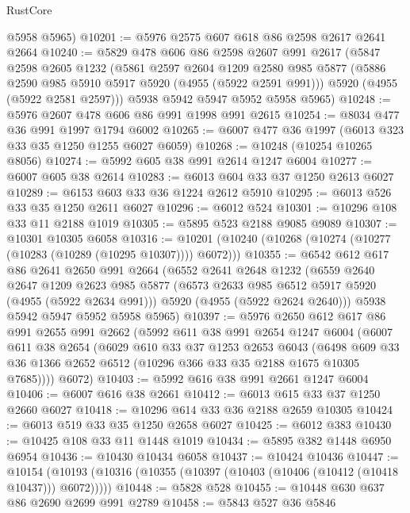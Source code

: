 \begin{lexlean}{RustCore}
\begin{coremodule}
      @5958
      @5965)
@10201 := @5976 @2575 @607 @618 @86 @2598 @2617 @2641 @2664
@10240 := @5829
    @478
    @606
    @86
    @2598
    @2607
    @991
    @2617
    (@5847
      @2598
      @2605
      @1232
      (@5861
        @2597
        @2604
        @1209
        @2580
        @985
        @5877
        (@5886 @2590 @985 @5910 @5917 @5920 (@4955 (@5922 @2591 @991)))
        @5920
        (@4955 (@5922 @2581 @2597)))
      @5938
      @5942
      @5947
      @5952
      @5958
      @5965)
@10248 := @5976 @2607 @478 @606 @86 @991 @1998 @991 @2615
@10254 := @8034 @477 @36 @991 @1997 @1794 @6002
@10265 := @6007 @477 @36 @1997 (@6013 @323 @33 @35 @1250 @1255 @6027 @6059)
@10268 := @10248 (@10254 @10265 @8056)
@10274 := @5992 @605 @38 @991 @2614 @1247 @6004
@10277 := @6007 @605 @38 @2614
@10283 := @6013 @604 @33 @37 @1250 @2613 @6027
@10289 := @6153 @603 @33 @36 @1224 @2612 @5910
@10295 := @6013 @526 @33 @35 @1250 @2611 @6027
@10296 := @6012 @524
@10301 := @10296 @108 @33 @11 @2188 @1019
@10305 := @5895 @523 @2188 @9085 @9089
@10307 := @10301 @10305 @6058
@10316 := @10201 (@10240 (@10268 (@10274 (@10277 (@10283 (@10289 (@10295 @10307)))) @6072)))
@10355 := @6542
    @612
    @617
    @86
    @2641
    @2650
    @991
    @2664
    (@6552
      @2641
      @2648
      @1232
      (@6559
        @2640
        @2647
        @1209
        @2623
        @985
        @5877
        (@6573 @2633 @985 @6512 @5917 @5920 (@4955 (@5922 @2634 @991)))
        @5920
        (@4955 (@5922 @2624 @2640)))
      @5938
      @5942
      @5947
      @5952
      @5958
      @5965)
@10397 := @5976
    @2650
    @612
    @617
    @86
    @991
    @2655
    @991
    @2662
    (@5992
      @611
      @38
      @991
      @2654
      @1247
      @6004
      (@6007
        @611
        @38
        @2654
        (@6029
          @610
          @33
          @37
          @1253
          @2653
          @6043
          (@6498 @609 @33 @36 @1366 @2652 @6512 (@10296 @366 @33 @35 @2188 @1675 @10305 @7685))))
      @6072)
@10403 := @5992 @616 @38 @991 @2661 @1247 @6004
@10406 := @6007 @616 @38 @2661
@10412 := @6013 @615 @33 @37 @1250 @2660 @6027
@10418 := @10296 @614 @33 @36 @2188 @2659 @10305
@10424 := @6013 @519 @33 @35 @1250 @2658 @6027
@10425 := @6012 @383
@10430 := @10425 @108 @33 @11 @1448 @1019
@10434 := @5895 @382 @1448 @6950 @6954
@10436 := @10430 @10434 @6058
@10437 := @10424 @10436
@10447 := @10154
    (@10193 (@10316 (@10355 (@10397 (@10403 (@10406 (@10412 (@10418 @10437))) @6072)))))
@10448 := @5828 @528
@10455 := @10448 @630 @637 @86 @2690 @2699 @991 @2789
@10458 := @5843 @527 @36 @5846

\end{coremodule}
\end{lexlean}

